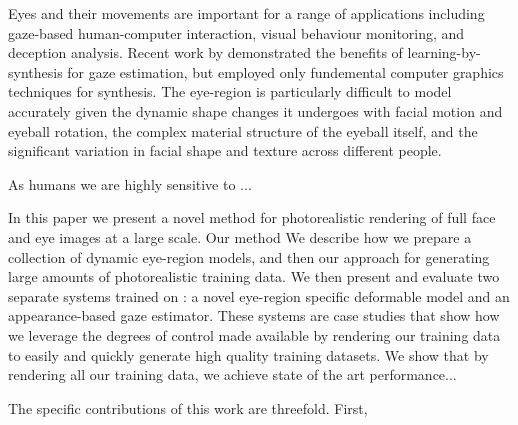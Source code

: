 Eyes and their movements are important for a range of applications including gaze-based human-computer interaction, visual behaviour monitoring, and deception analysis.  Recent work by \citet{sugano2014learning} demonstrated the benefits of learning-by-synthesis for gaze estimation, but employed only fundemental computer graphics techniques for synthesis.
The eye-region is particularly difficult to model accurately given the dynamic shape changes it undergoes with facial motion and eyeball rotation, the complex material structure of the eyeball itself, and the significant variation in facial shape and texture across different people.


As humans we are highly sensitive to ...



In this paper we present a novel method for photorealistic rendering of full face and eye images at a large scale.
Our method 
We describe how we prepare a collection of dynamic eye-region models, and then our approach for generating large amounts of photorealistic training data.
We then present and evaluate two separate systems trained on \dataset: a novel eye-region specific deformable model and an appearance-based gaze estimator.
These systems are case studies that show how we leverage the degrees of control made available by rendering our training data to easily and quickly generate high quality training datasets.
We show that by rendering all our training data, we achieve state of the art performance...

The specific contributions of this work are threefold. First, 

